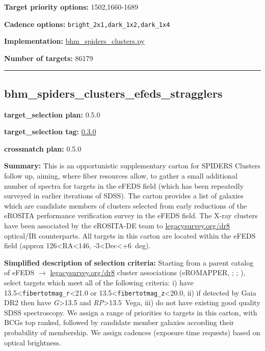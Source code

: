 \noindent\textbf{Target priority options:} 1502,1660-1689

\noindent\textbf{Cadence options:} \texttt{bright\_2x1,dark\_1x2,dark\_1x4}

\noindent\textbf{Implementation:}
\href{https://github.com/sdss/target_selection/blob/0.3.0/python/target_selection/cartons/bhm_spiders_clusters.py}{bhm\_spiders\_clusters.py}

\noindent\textbf{Number of targets:} 86179

\begin{center}\rule{0.5\linewidth}{0.5pt}\end{center}

\hypertarget{bhm_spiders_clusters_efeds_stragglers_plan0.5.0}{%
\subsection{bhm\_spiders\_clusters\_efeds\_stragglers}\label{bhm_spiders_clusters_efeds_stragglers_plan0.5.0}}

\noindent\textbf{target\_selection plan:} 0.5.0

\noindent\textbf{target\_selection tag:}
\href{https://github.com/sdss/target_selection/tree/0.3.0/}{0.3.0}

\noindent\textbf{crossmatch plan:} 0.5.0

\noindent\textbf{Summary:} This is an opportunistic supplementary carton for
SPIDERS Clusters follow up, aiming, where fiber resources allow, to
gather a small additional number of spectra for targets in the eFEDS
field (which has been repeatedly surveyed in earlier iterations of
SDSS). The carton provides a list of galaxies which are candidate
members of clusters selected from early reductions of the eROSITA
performance verification survey in the eFEDS field. The X-ray clusters
have been associated by the eROSITA-DE team to
\href{https://www.legacysurvey.org/dr8/}{legacysurvey.org/dr8}
optical/IR counterparts. All targets in this carton are located within
the eFEDS field (approx 126\textless RA\textless146,
-3\textless Dec\textless+6~deg).

\noindent\textbf{Simplified description of selection criteria:} Starting from a
parent catalog of eFEDS $\rightarrow$
\href{https://www.legacysurvey.org/dr8}{legacysurvey.org/dr8} cluster
associations (eROMAPPER,
\citealt{Rykoff2014};
\citealt{IderChitham2020};
\citealt{Liu2022}), select targets which meet all of the following criteria:
i) have 13.5\textless{}\texttt{fibertotmag\_r}\textless21.0 or
13.5\textless{}\texttt{fibertotmag\_z}\textless20.0, ii) if detected by
Gaia DR2 then have \emph{G}\textgreater13.5 and
\emph{RP}\textgreater13.5~Vega, iii) do not have existing good quality
SDSS spectroscopy. We assign a range of priorities to targets in this
carton, with BCGs top ranked, followed by candidate member galaxies
according their probability of membership. We assign cadences (exposure
time requests) based on optical brightness.


